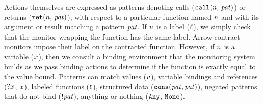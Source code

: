 Actions themselves are expressed as patterns denoting calls (${\tt call}(n,\, \mathit{pat})$) or returns (${\tt ret}(n,\, \mathit{pat})$), with respect to a particular function named $n$ and with its argument or result matching a pattern $\mathit{pat}$.
%
If $n$ is a label ($\ell$), we simply check that the monitor wrapping the function has the same label.
%
Arrow contract monitors impose their label on the contracted function.
%
However, if $n$ is a variable ($x$), then we consult a binding environment that the monitoring system builds as we pass binding actions to determine if the function is exactly equal to the value bound.
%
Patterns can match values ($v$), variable bindings and references (${\tt ?} x$, $x$), labeled functions ($\ell$), structured data (${\tt cons}(\mathit{pat},\mathit{pat})$), negated patterns that do not bind ($! \mathit{pat}$), anything or nothing (${\tt Any}$, ${\tt None}$).
%
%
